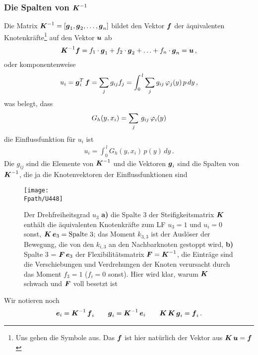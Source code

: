 {{\textcolor{sectionTitleBlue}{\subsubsection*{Die Spalten von $\mbox{\boldmath $K$}^{-1}$}}}
Die Matrix $\mbox{\boldmath $K$}^{-1} = [\mbox{\boldmath $g$}_1, \mbox{\boldmath $g$}_2, \ldots, \mbox{\boldmath $g$}_n]$ bildet den Vektor $\mbox{\boldmath $f$}$ der \"{a}quivalenten Knotenkr\"{a}fte\footnote{Uns gehen die Symbole aus. Das $\mbox{\boldmath $f$}$ ist hier nat\"{u}rlich der Vektor aus $\mbox{\boldmath $K$}\,\mbox{\boldmath $u$} = \mbox{\boldmath $f$}$} auf den Vektor $\mbox{\boldmath $u$}$ ab
\begin{align}
\mbox{\boldmath $K$}^{-1} \mbox{\boldmath $f$} = f_1 \cdot \mbox{\boldmath $g$}_1 + f_2 \cdot \mbox{\boldmath $g$}_2 + \ldots + f_n \cdot \mbox{\boldmath $g$}_n = \mbox{\boldmath $u$}\,,
\end{align}
oder komponentenweise
\begin{align}
u_i = \mbox{\boldmath $g$}_i^T\,\mbox{\boldmath $f$} = \sum_j g_{ij} f_j  = \int_0^{\,l} \sum_j g_{ij}  \,\varphi_j(y)\,p\,dy\,,
\end{align}
was belegt, dass
\begin{align}
G_h(y,x_i)= \sum_j\, g_{ij} \,\varphi_i(y)
\end{align}
die Einflussfunktion f\"{u}r $u_i$ ist
\begin{align}
u_i = \int_0^{\,l} G_h(y,x_i)\,p(y)\,dy\,.
\end{align}
Die $g_{ij}$ sind die Elemente von $\mbox{\boldmath $K$}^{-1}$ und die Vektoren $\mbox{\boldmath $g$}_i$ sind die Spalten von $\mbox{\boldmath $K$}^{-1}$, die ja die Knotenvektoren der Einflussfunktionen sind
\begin{figure}
\centering
\if {} \sidecaption \fi
\texttt{[image: \\Fpath/U448]}
\caption{Der Drehfreiheitsgrad $u_{3}$ \textbf{ a)} die Spalte 3 der Steifigkeitsmatrix $\mbox{\boldmath $K$}$ enth\"{a}lt die \"{a}quivalenten Knotenkr\"{a}fte zum LF $u_{3} = 1$ und $u_i = 0$ sonst, $\mbox{\boldmath $K$}\,\mbox{\boldmath $e$}_{3} = \text{Spalte 3}$; das Moment $k_{3,3}$ ist der Ausl\"{o}ser der Bewegung, die von den $k_{i,3}$ an den Nachbarknoten gestoppt wird, \textbf{ b)} Spalte 3 = $\mbox{\boldmath $F$}\,\mbox{\boldmath $e$}_{3}$ der Flexibilit\"{a}tsmatrix $\mbox{\boldmath $F$} = \mbox{\boldmath $K$}^{-1}$, die Eintr\"{a}ge sind die Verschiebungen und Verdrehungen der Knoten verursacht durch das Moment $f_{3} = 1$ ($f_i = 0$ sonst). Hier wird klar, warum $\mbox{\boldmath $K$}$ schwach und $\mbox{\boldmath $F$}$ voll besetzt ist }
\label{U448}%
\end{figure}%
Wir notieren noch
\begin{align}
\mbox{\boldmath $e$}_i = \mbox{\boldmath $K$}^{-1}\,\mbox{\boldmath $f$}_i \qquad \mbox{\boldmath $g$}_i = \mbox{\boldmath $K$}^{-1}\,\mbox{\boldmath $e$}_i \qquad \mbox{\boldmath $K$}\,\mbox{\boldmath $K$}\,\mbox{\boldmath $g$}_i = \mbox{\boldmath $f$}_i\,.
\end{align}

}
